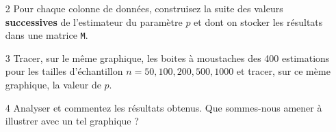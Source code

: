 \documentclass[a4paper,reqno,11pt]{article}
\begin{document}
\begin{partie}
{\begin{itemize}
			\vspace{1ex}
						
			\item[2] Pour chaque colonne de données, construisez la suite des valeurs \textbf{successives} de l'estimateur du paramètre $p$ et dont on stocker les résultats dans une matrice \verb|M|. 
			
			\vspace{1ex}
			
			\item[3] Tracer, sur le même graphique, les boites à moustaches des 400 estimations pour les tailles d'échantillon $n=50, 100,$$200, 500, 1000$ et tracer, sur ce mème graphique, la valeur de $p$.
			
			\vspace{1ex}
			
			\item [4] Analyser et commentez les résultats obtenus. 
			Que sommes-nous amener à illustrer avec un tel graphique ?
			
			
%						
		\end{itemize}
	
	
		
		
	
}\end{partie}
\end{document}
